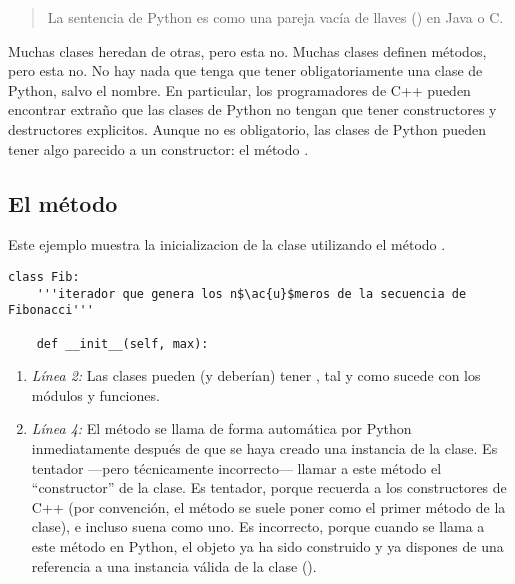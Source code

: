 \begin{quote}
La sentencia  de Python es como una pareja vacía de llaves (\codigo{\{\}}) en Java o C.
\end{quote}

Muchas clases heredan de otras, pero esta no. Muchas clases definen métodos, pero esta no. No hay nada que tenga que tener obligatoriamente una clase de Python, salvo el nombre. En particular, los programadores de C++ pueden encontrar extraño que las clases de Python no tengan que tener constructores y destructores explicitos. Aunque no es obligatorio, las clases de Python pueden tener algo parecido a un constructor: el método .

\subsection{El método }

Este ejemplo muestra la inicializacion de la clase  utilizando el método .

\noindent\begin{minipage}{\textwidth}
\begin{lstlisting}[mathescape=True]
class Fib:
    '''iterador que genera los n$\ac{u}$meros de la secuencia de Fibonacci'''

    def __init__(self, max):
\end{lstlisting}
\end{minipage}

\begin{enumerate}

\item \emph{Línea 2:} Las clases pueden (y deberían) tener , tal y como sucede con los módulos y funciones.

\item \emph{Línea 4:} El método  se llama de forma automática por Python inmediatamente después de que se haya creado una instancia de la clase. Es tentador ---pero técnicamente incorrecto--- llamar a este método el ``constructor'' de la clase. Es tentador, porque recuerda a los constructores de C++ (por convención, el método  se suele poner como el primer método de la clase), e incluso suena como uno. Es incorrecto, porque cuando se llama a este método en Python, el objeto ya ha sido construido y ya dispones de una referencia a una instancia válida de la clase ().

\end{enumerate}

